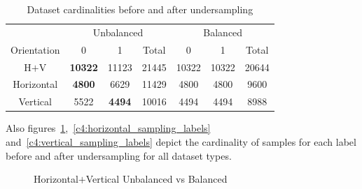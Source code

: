 \begin{table}[ht!]
\centering
\begin{tabular}{|c|c|c|c|c|c|c|}
\cline{1-7}
  & \multicolumn{3}{c|}{Unbalanced} & \multicolumn{3}{c|}{Balanced} \\ \cline{1-7} 
 Orientation  &   0    &   1    &  Total     &   0    &   1    &  Total     \\ \cline{1-7} 
H$+$V & \textbf{10322} & 11123 & 21445 & 10322 & 10322  &  20644 \\ \cline{1-7} 
Horizontal  & \textbf{4800} & 6629 & 11429 & 4800 & 4800 &  9600  \\ \cline{1-7} 
Vertical & 5522 & \textbf{4494}  & 10016 & 4494 & 4494 &  8988     \\ \cline{1-7} 
\end{tabular}
\caption{Dataset cardinalities before and after undersampling}
\label{c4:sampling_table}
\end{table}

Also figures~\ref{c4:all_sampling_labels},~\ref{c4:horizontal_sampling_labels} and~\ref{c4:vertical_sampling_labels} depict the cardinality of samples for each label before and after undersampling for all dataset types.

\begin{figure}[ht!]
    \centering  
    \caption{Horizontal$+$Vertical Unbalanced vs Balanced}
    \label{c4:all_sampling_labels}
\end{figure}

